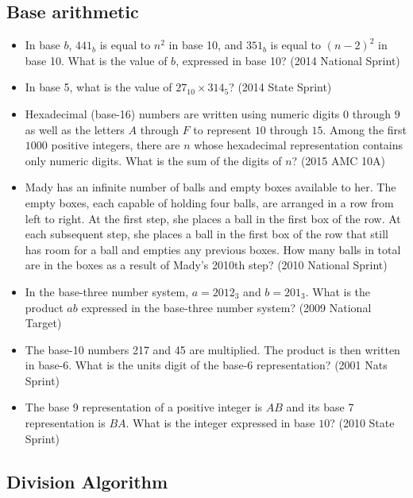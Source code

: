 \documentclass{article}
\begin{document}
\subsection{Base arithmetic}

\begin{itemize}

\item In base $b$, $441_b$ is equal to $n^2$ in base 10, and $351_b$ is equal to $(n-2)^2$ in base 10. What is the value of $b$, expressed in base 10? (2014 National Sprint)

\item In base 5, what is the value of $27_{10}\times 314_5$? (2014 State Sprint)

\item Hexadecimal (base-16) numbers are written using numeric digits $0$ through $9$ as well as the letters $A$ through $F$ to represent $10$ through $15$. Among the first $1000$ positive integers, there are $n$ whose hexadecimal representation contains only numeric digits. What is the sum of the digits of $n$? (2015 AMC 10A)

\item Mady has an infinite number of balls and empty boxes available to her. The empty boxes, each capable of holding four balls, are arranged in a row from left to right. At the first step, she places a ball in the first box of the row. At each subsequent step, she places a ball in the first box of the row that still has room for a ball and empties any previous boxes. How many balls in total are in the boxes as a result of Mady's 2010th step? (2010 National Sprint)

\item In the base-three number system, $a=2012_3$ and $b=201_3$. What is the product $ab$ expressed in the base-three number system? (2009 National Target)

\item The base-10 numbers 217 and 45 are multiplied. The product is then written in base-6. What is the units digit of the base-6 representation? (2001 Nats Sprint)

\item The base 9 representation of a positive integer is $AB$ and its base 7 representation is $BA$. What is the integer expressed in base $10$? (2010 State Sprint)


\end{itemize}


\subsection{Division Algorithm}
\end{document}
